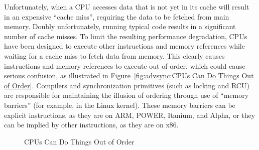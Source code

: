 Unfortunately, when a CPU accesses data that is not yet in its cache
will result in an expensive ``cache miss'', requiring the data to
be fetched from main memory.
Doubly unfortunately, running typical code results in a significant
number of cache misses.
To limit the resulting performance degradation, CPUs have been designed to
execute other instructions and memory references while waiting for
a cache miss to fetch data from memory.
This clearly causes instructions and memory references to execute out
of order, which could cause serious confusion, as illustrated in
Figure~\ref{fig:advsync:CPUs Can Do Things Out of Order}.
Compilers and synchronization primitives (such as locking and RCU)
are responsible for maintaining the illusion of ordering through use of
``memory barriers'' (for example,  in the Linux kernel).
These memory barriers can be explicit instructions, as they are on
ARM, POWER, Itanium, and Alpha, or they can be implied by other instructions,
as they are on x86.

\begin{figure}[htb]
\centering
{}
\caption{CPUs Can Do Things Out of Order}
\end{figure}

